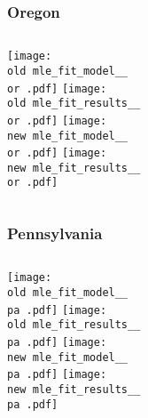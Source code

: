 \documentclass{beamer}
\newcommand{\old}{api-370-prod/pyseir/state_summaries/reports/}
\newcommand{\new}{new/pyseir/state_summaries/reports/}
\newcommand{\or}{Oregon__41}
\newcommand{\pa}{Pennsylvania__42}
\begin{document}
\begin{frame}
\frametitle{Oregon}
    \begin{columns}[t]

       \texttt{[image: \\old mle\_fit\_model\_\_\\or .pdf]}
       \texttt{[image: \\old mle\_fit\_results\_\_\\or .pdf]}   
       \texttt{[image: \\new mle\_fit\_model\_\_\\or .pdf]}
       \texttt{[image: \\new mle\_fit\_results\_\_\\or .pdf]}   
\end{columns}
\end{frame}

\begin{frame}
\frametitle{Pennsylvania}
    \begin{columns}[t]

       \texttt{[image: \\old mle\_fit\_model\_\_\\pa .pdf]}
       \texttt{[image: \\old mle\_fit\_results\_\_\\pa .pdf]}   
       \texttt{[image: \\new mle\_fit\_model\_\_\\pa .pdf]}
       \texttt{[image: \\new mle\_fit\_results\_\_\\pa .pdf]}   
\end{columns}
\end{frame}
\end{document}
